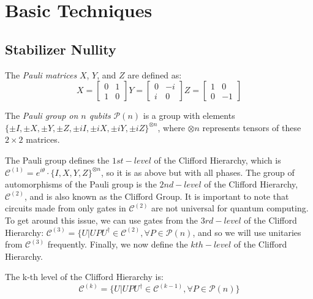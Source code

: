 \documentclass[12pt]{dalthesis}
\begin{document}
\chapter{Basic Techniques}

\section{Stabilizer Nullity}

\begin{definition}
The \emph{Pauli matrices} $X$, $Y$, and $Z$ are defined as:
  \[
  X= \begin{bmatrix}
    0 & 1 \\
    1 & 0
  \end{bmatrix}
  Y = \begin{bmatrix}
  0 & -i \\
  i & 0
  \end{bmatrix}
  Z = \begin{bmatrix}
  1 & 0 \\
  0 & -1
  \end{bmatrix}
  \]
\end{definition}

\begin{definition}
\label{PauliGroup}
  The \emph{Pauli group on $n$ qubits} $\mathcal{P}(n)$ is a group with elements $\{ \pm I, \pm X, \pm Y, \pm Z, \pm iI, \pm iX, \pm iY, \pm iZ \}^{\otimes n}$, where $\otimes n$ represents tensors of these $ 2 \times 2$ matrices.
\end{definition}

The Pauli group defines the $1st-level$ of the Clifford Hierarchy, which is $\mathcal{C}^{(1)} = e^{i\theta} \cdot \{I, X, Y, Z\}^{\otimes n}$, so it is as above but with all phases. The group of automorphisms of the Pauli group is the $2nd-level$ of the Clifford Hierarchy, $\mathcal{C}^{(2)}$, and is also known as the Clifford Group. It is important to note that circuits made from only gates in $\mathcal{C}^{(2)}$ are not universal for quantum computing. To get around this issue, we can use gates from the $3rd-level$ of the Clifford Hierarchy: $\mathcal{C}^{(3)} = \{ U | UPU^{\dag} \in \mathcal{C}^{(2)}, \forall P \in \mathcal{P}(n)$, and so we will use unitaries from $\mathcal{C}^{(3)}$ frequently. Finally, we now define the $kth-level$ of the Clifford Hierarchy. 

\begin{definition} The k-th level of the Clifford Hierarchy is:
\label{CliffHierarchy}
\begin{equation}
\mathcal{C}^{(k)} = \{ U | UPU^{\dag} \in \mathcal{C}^{(k-1)}, \forall P \in \mathcal{P}(n) \}
\end{equation}
\end{definition}
\end{document}
